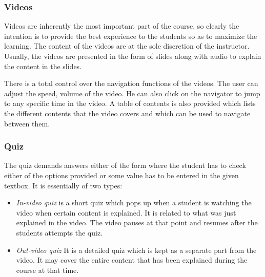 \subsubsection*{Videos}
\hspace{0.35cm} Videos are inherently the most important part of the course, so clearly the intention is to provide the best experience to the students so as to maximize the learning. The content of the videos are at the sole discretion of the instructor. Usually, the videos are presented in the form of slides along with audio to explain the content in the slides.
\par There is a total control over the navigation functions of the videos. The user can adjust the speed, volume of the video. He can also click on the navigator to jump to any specific time in the video. A table of contents is also provided which lists the different contents that the video covers and which can be used to navigate between them.

\subsubsection*{Quiz}
The quiz demands answers either of the form where the student has to check either of the options provided or some value has to be entered in the given textbox. It is essentially of two types: 
\begin{itemize}
	\item \emph{In-video quiz} is a short quiz which pops up when a student is watching the video when certain content is explained. It is related to what was just explained in the video. The video pauses at that point and resumes after the students attempts the quiz.
	\item \emph{Out-video quiz} It is a detailed quiz which is kept as a separate part from the video. It may cover the entire content that has been explained during the course at that time.
\end{itemize}